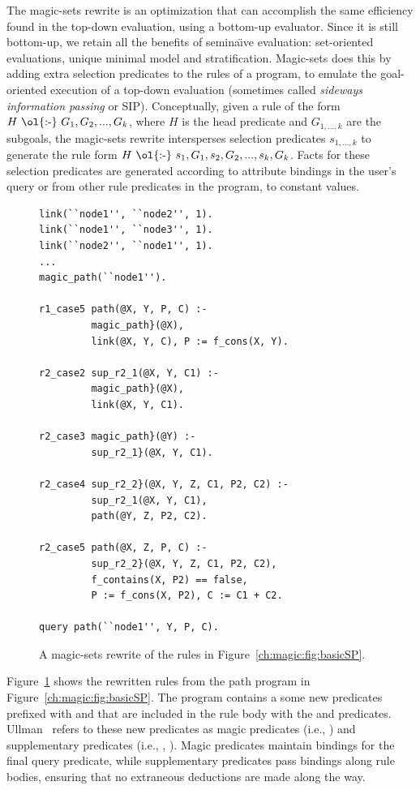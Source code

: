 The magic-sets rewrite is an optimization that can accomplish the same
efficiency found in the top-down evaluation, using a bottom-up evaluator.
Since it is still bottom-up, we retain all the benefits of semina\"{\i}ve
evaluation: set-oriented evaluations, unique minimal model and stratification.
Magic-sets does this by adding extra selection predicates to the rules of a
program, to emulate the goal-oriented execution of a top-down evaluation
(sometimes called {\em sideways information passing} or SIP).  Conceptually,
given a rule of the form $H\ \text{\ol{:-}}\ G_1, G_2, ..., G_k$, where $H$ is
the head predicate and $G_{1,...,k}$ are the subgoals, the magic-sets rewrite
intersperses selection predicates $s_{1,...,k}$ to generate the rule form $H\
\text{\ol{:-}}\ s_1, G_1, s_2, G_2, ..., s_{k}, G_k$.  Facts for these
selection predicates are generated according to attribute bindings in the
user's query or from other rule predicates in the program, to constant values.

\begin{figure}[!t]
\ssp
\begin{lstlisting}
link(``node1'', ``node2'', 1).
link(``node1'', ``node3'', 1).
link(``node2'', ``node1'', 1).
...
magic_path(``node1'').

r1_case5 path(@X, Y, P, C) :-
         magic_path}(@X),
         link(@X, Y, C), P := f_cons(X, Y).

r2_case2 sup_r2_1(@X, Y, C1) :-
         magic_path}(@X),
         link(@X, Y, C1).

r2_case3 magic_path}(@Y) :-
         sup_r2_1}(@X, Y, C1).

r2_case4 sup_r2_2}(@X, Y, Z, C1, P2, C2) :-
         sup_r2_1(@X, Y, C1),
         path(@Y, Z, P2, C2).

r2_case5 path(@X, Z, P, C) :-
         sup_r2_2}(@X, Y, Z, C1, P2, C2),
         f_contains(X, P2) == false,
         P := f_cons(X, P2), C := C1 + C2.

query path(``node1'', Y, P, C).
\end{lstlisting}
\caption{\label{ch:magic:fig:magicSP}A magic-sets rewrite of 
the rules in Figure~\ref{ch:magic:fig:basicSP}.}
\end{figure}

Figure~\ref{ch:magic:fig:magicSP} shows the rewritten rules from the path
program in Figure~\ref{ch:magic:fig:basicSP}.  The program contains a some new
predicates prefixed with \ol{magic\_} and \ol{sup\_} that are included in the
rule body with the \ol{link} and \ol{path} predicates.
Ullman~\cite{ullmanbook} refers to these new predicates as magic predicates
(i.e., \ol{magic\_path}) and supplementary predicates (i.e., \ol{sup\_r2\_1},
\ol{sup\_r2\_2}).  Magic predicates maintain bindings for the final query
predicate, while supplementary predicates pass bindings along rule bodies,
ensuring that no extraneous deductions are made along the way.

